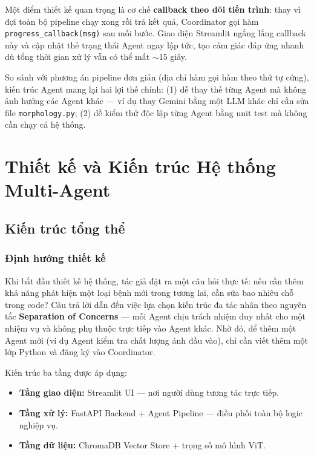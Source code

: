 \documentclass[13pt,a4paper]{extreport}
\begin{document}
Một điểm thiết kế quan trọng là cơ chế \textbf{callback theo dõi tiến trình}: thay vì đợi toàn bộ pipeline chạy xong rồi trả kết quả, Coordinator gọi hàm \texttt{progress\_callback(msg)} sau mỗi bước. Giao diện Streamlit ngắng lắng callback này và cập nhật thẻ trạng thái Agent ngay lập tức, tạo cảm giác đáp ứng nhanh dù tổng thời gian xử lý vẫn có thể mất $\sim$15 giây.

So sánh với phương án pipeline đơn giản (địa chỉ hàm gọi hàm theo thứ tự cứng), kiến trúc Agent mang lại hai lợi thế chính: (1) dễ thay thế từng Agent mà không ảnh hưởng các Agent khác --- ví dụ thay Gemini bằng một LLM khác chỉ cần sửa file \texttt{morphology.py}; (2) dễ kiểm thử độc lập từng Agent bằng unit test mà không cần chạy cả hệ thống.

\chapter{Thiết kế và Kiến trúc Hệ thống Multi-Agent}

\section{Kiến trúc tổng thể}

\subsection{Định hướng thiết kế}
Khi bắt đầu thiết kế hệ thống, tác giả đặt ra một câu hỏi thực tế: nếu cần thêm khả năng phát hiện một loại bệnh mới trong tương lai, cần sửa bao nhiêu chỗ trong code? Câu trả lời dẫn đến việc lựa chọn kiến trúc đa tác nhân theo nguyên tắc \textbf{Separation of Concerns} --- mỗi Agent chịu trách nhiệm duy nhất cho một nhiệm vụ và không phụ thuộc trực tiếp vào Agent khác. Nhờ đó, để thêm một Agent mới (ví dụ Agent kiểm tra chất lượng ảnh đầu vào), chỉ cần viết thêm một lớp Python và đăng ký vào Coordinator.

Kiến trúc ba tầng được áp dụng:
\begin{itemize}[leftmargin=1.5cm]
    \item \textbf{Tầng giao diện:} Streamlit UI --- nơi người dùng tương tác trực tiếp.
    \item \textbf{Tầng xử lý:} FastAPI Backend + Agent Pipeline --- điều phối toàn bộ logic nghiệp vụ.
    \item \textbf{Tầng dữ liệu:} ChromaDB Vector Store + trọng số mô hình ViT.
\end{itemize}
\end{document}

